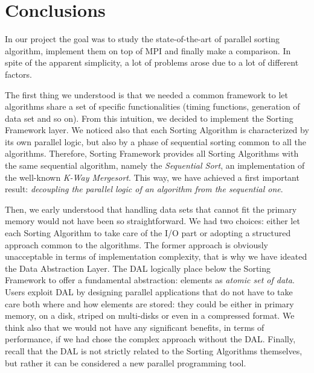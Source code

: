 \label{conclusion}
\section{Conclusions}
In our project the goal was to study the state-of-the-art of parallel sorting algorithm, implement them on top of MPI and finally make a comparison. In spite of the apparent simplicity, a lot of problems arose due to a lot of different factors.  

The first thing we understood is that we needed a common framework to let algorithms share a set of specific functionalities (timing functions, generation of data set and so on). From this intuition, we decided to implement the Sorting Framework layer. We noticed also that each Sorting Algorithm is characterized by its own parallel logic, but also by a phase of sequential sorting common to all the algorithms. Therefore, Sorting Framework provides all Sorting Algorithms with the same sequential algorithm, namely the \textit{Sequential Sort}, an implementation of the well-known \textit{K-Way Mergesort}. This way, we have achieved a first important result: \textit{decoupling the parallel logic of an algorithm from the sequential one}. 

Then, we early understood that handling data sets that cannot fit the primary memory would not have been so straightforward. We had two choices: either let each Sorting Algorithm to take care of the I/O part or adopting a structured approach common to the algorithms. The former approach is obviously unacceptable in terms of implementation complexity, that is why we have ideated the Data Abstraction Layer. The DAL logically place below the Sorting Framework to offer a fundamental abstraction: elements as \textit{atomic set of data}. Users exploit DAL by designing parallel applications that do not have to take care both where and how elements are stored: they could be either in primary memory, on a disk, striped on multi-disks or even in a compressed format. We think also that we would not have any significant benefits, in terms of performance, if we had chose the complex approach without the DAL. Finally, recall that the DAL is not strictly related to the Sorting Algorithms themselves, but rather it can be considered a new parallel programming tool.

